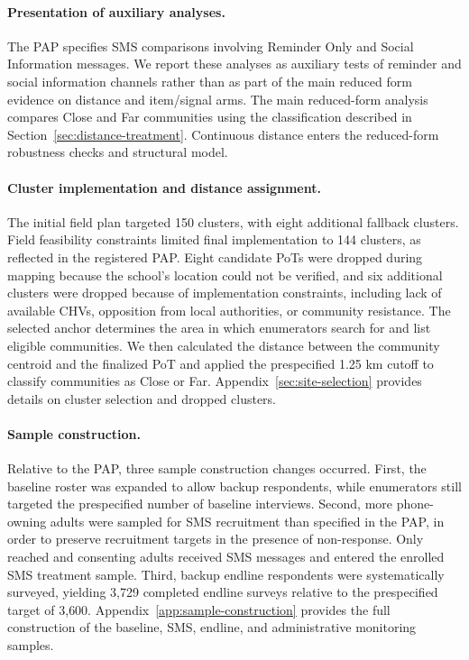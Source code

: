 \documentclass[ECM\space ReStud.tex]{subfiles}
\begin{document}
\paragraph{Presentation of auxiliary analyses.}
The PAP specifies SMS comparisons involving Reminder Only and Social Information messages. We report these analyses as auxiliary tests of reminder and social information channels rather than as part of the main reduced form evidence on distance and item/signal arms. The main reduced-form analysis compares Close and Far communities using the classification described in Section~\ref{sec:distance-treatment}. Continuous distance enters the reduced-form robustness checks and structural model.

\paragraph{Cluster implementation and distance assignment.}
The initial field plan targeted 150 clusters, with eight additional fallback clusters. Field feasibility constraints limited final implementation to 144 clusters, as reflected in the registered PAP. Eight candidate PoTs were dropped during mapping because the school's location could not be verified, and six additional clusters were dropped because of implementation constraints, including lack of available CHVs, opposition from local authorities, or community resistance. The selected anchor determines the area in which enumerators search for and list eligible communities. We then calculated the distance between the community centroid and the finalized PoT and applied the prespecified 1.25 km cutoff to classify communities as Close or Far. Appendix~\ref{sec:site-selection} provides details on cluster selection and dropped clusters.

\paragraph{Sample construction.}
Relative to the PAP, three sample construction changes occurred. First, the baseline roster was expanded to allow backup respondents, while enumerators still targeted the prespecified number of baseline interviews. Second, more phone-owning adults were sampled for SMS recruitment than specified in the PAP, in order to preserve recruitment targets in the presence of non-response. Only reached and consenting adults received SMS messages and entered the enrolled SMS treatment sample. Third, backup endline respondents were systematically surveyed, yielding 3{,}729 completed endline surveys relative to the prespecified target of 3{,}600. Appendix~\ref{app:sample-construction} provides the full construction of the baseline, SMS, endline, and administrative monitoring samples.
\end{document}
